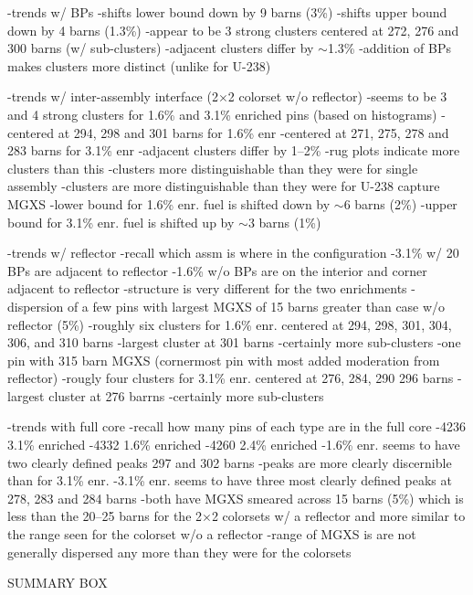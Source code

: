 -trends w/ \acp{BP}
  -shifts lower bound down by 9 barns (3\%)
  -shifts upper bound down by 4 barns (1.3\%)
  -appear to be 3 strong clusters centered at 272, 276 and 300 barns (w/ sub-clusters)
    -adjacent clusters differ by $\sim$1.3\%
  -addition of \acp{BP} makes clusters more distinct (unlike for U-238)
  
-trends w/ inter-assembly interface (2$\times$2 colorset w/o reflector)
  -seems to be 3 and 4 strong clusters for 1.6\% and 3.1\% enriched pins (based on histograms)
    -centered at 294, 298 and 301 barns for 1.6\% enr
    -centered at 271, 275, 278 and 283 barns for 3.1\% enr
    -adjacent clusters differ by 1--2\%
  -rug plots indicate more clusters than this
  -clusters more distinguishable than they were for single assembly  
  -clusters are more distinguishable than they were for U-238 capture \ac{MGXS}
  -lower bound for 1.6\% enr. fuel is shifted down by $\sim$6 barns (2\%)
  -upper bound for 3.1\% enr. fuel is shifted up by $\sim$3 barns (1\%)

-trends w/ reflector
  -recall which assm is where in the configuration
    -3.1\% w/ 20 \acp{BP} are adjacent to reflector
    -1.6\% w/o \acp{BP} are on the interior and corner adjacent to reflector
  -structure is very different for the two enrichments
    -dispersion of a few pins with largest \ac{MGXS} of 15 barns greater than case w/o reflector (5\%)
  -roughly six clusters for 1.6\% enr. centered at 294, 298, 301, 304, 306, and 310 barns
    -largest cluster at 301 barns
    -certainly more sub-clusters
    -one pin with 315 barn \ac{MGXS} (cornermost pin with most added moderation from reflector)
  -rougly four clusters for 3.1\% enr. centered at 276, 284, 290 296 barns
    -largest cluster at 276 barrns
    -certainly more sub-clusters
  
-trends with full core
  -recall how many pins of each type are in the full core
    -4236 3.1\% enriched
    -4332 1.6\% enriched
    -4260 2.4\% enriched
  -1.6\% enr. seems to have two clearly defined peaks 297 and 302 barns
    -peaks are more clearly discernible than for 3.1\% enr.
  -3.1\% enr. seems to have three most clearly defined peaks at 278, 283 and 284 barns
  -both have \ac{MGXS} smeared across 15 barns (5\%) which is less than the 20--25 barns for the 2$\times$2 colorsets w/ a reflector and more similar to the range seen for the colorset w/o a reflector
  -range of \ac{MGXS} is are not generally dispersed any more than they were for the colorsets 

SUMMARY BOX

